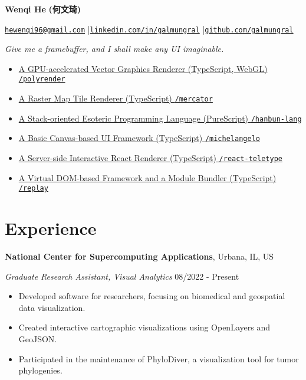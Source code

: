 \documentclass[12pt]{article}
\begin{document}
{\Huge\bf Wenqi He} {\Large\bf\cjkfont (何文琦)}

\vspace{1em}
\href{mailto:hewenqi96@gmail.com}{\texttt{hewenqi96@gmail.com}} \quad|\quad \href{https://linkedin.com/in/galmungral}{\texttt{linkedin.com/in/galmungral}} \quad|\quad \href{https://github.com/galmungral}{\texttt{github.com/galmungral}}

\vspace{1em}
\textit{Give me a framebuffer, and I shall make any UI imaginable.}

\begin{itemize}
\item \href{https://galmungral.github.io/polyrender}{A GPU-accelerated Vector Graphics Renderer (TypeScript, WebGL) \hfill \texttt{/polyrender}}
\item \href{https://galmungral.github.io/mercator?lon=-73.9855&lat=40.7580}{A Raster Map Tile Renderer (TypeScript) \hfill \texttt{/mercator}}
\item \href{https://galmungral.github.io/hanbun-lang}{A Stack-oriented Esoteric Programming Language (PureScript) \hfill \texttt{/hanbun-lang}}
\item \href{https://galmungral.github.io/michelangelo}{A Basic Canvas-based UI Framework (TypeScript) \hfill \texttt{/michelangelo}}
\item\href{https://github.com/galmungral/react-teletype}{A Server-side Interactive React Renderer (TypeScript) \hfill \texttt{/react-teletype}}
\item \href{https://github.com/galmungral/replay}{A Virtual DOM-based Framework and a Module Bundler (TypeScript) \hfill \texttt{/replay}}
\end{itemize}

\section*{Experience}

\textbf{National Center for Supercomputing Applications}, Urbana, IL, US

\textit{Graduate Research Assistant, Visual Analytics} \hfill 08/2022 - Present

\begin{itemize}
\item Developed software for researchers, focusing on biomedical and geospatial data visualization.
\item Created interactive cartographic visualizations using OpenLayers and GeoJSON.
\item Participated in the maintenance of PhyloDiver, a visualization tool for tumor phylogenies.
\end{itemize}
\end{document}
